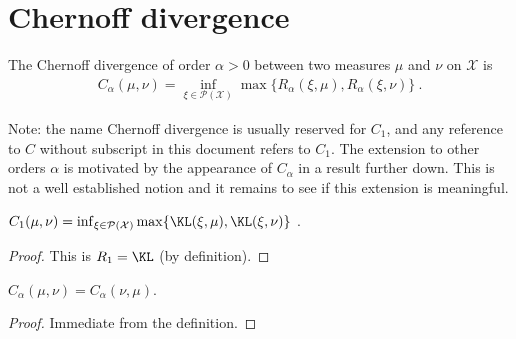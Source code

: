 





\appendix




%

\section{Chernoff divergence}

\begin{definition}
  \label{def:Chernoff}
  \leanok
    The Chernoff divergence of order $\alpha > 0$ between two measures $\mu$ and $\nu$ on $\mathcal X$ is
  \begin{align*}
    C_\alpha(\mu, \nu) = \inf_{\xi \in \mathcal P(\mathcal X)}\max\{R_\alpha(\xi, \mu), R_\alpha(\xi, \nu)\} \: .
  \end{align*}
\end{definition}

Note: the name Chernoff divergence is usually reserved for $C_1$, and any reference to $C$ without subscript in this document refers to $C_1$.
The extension to other orders $\alpha$ is motivated by the appearance of $C_\alpha$ in a result further down.
This is not a well established notion and it remains to see if this extension is meaningful.

\begin{lemma}
  \label{lem:chernoff_eq_kl}
  \leanok
  $C_1(\mu, \nu) = \inf_{\xi \in \mathcal P(\mathcal X)}\max\{\KL(\xi, \mu), \KL(\xi, \nu)\}$ .
\end{lemma}

\begin{proof}\leanok
{}
This is $R_1 = \KL$ (by definition).
\end{proof}


\begin{lemma}[Symmetry]
  \label{lem:chernoff_symm}
  $C_\alpha(\mu, \nu) = C_\alpha(\nu, \mu)$.
\end{lemma}

\begin{proof}%
Immediate from the definition.
\end{proof}


